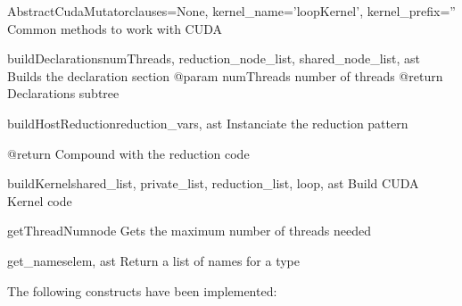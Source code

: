 \documentclass[a4paper,10pt,english]{manual}
\begin{document}
\hypertarget{Backends.CudaBackend.Mutators.Common.AbstractCudaMutator}{}\begin{classdesc}{AbstractCudaMutator}{clauses=None, kernel\_name='loopKernel', kernel\_prefix=''}
Common methods to work with CUDA

\hypertarget{Backends.CudaBackend.Mutators.Common.AbstractCudaMutator.buildDeclarations}{}\begin{methoddesc}{buildDeclarations}{numThreads, reduction\_node\_list, shared\_node\_list, ast}
Builds the declaration section 
@param numThreads number of threads
@return Declarations subtree
\end{methoddesc}

\hypertarget{Backends.CudaBackend.Mutators.Common.AbstractCudaMutator.buildHostReduction}{}\begin{methoddesc}{buildHostReduction}{reduction\_vars, ast}
Instanciate the reduction pattern

@return Compound with the reduction code
\end{methoddesc}

\hypertarget{Backends.CudaBackend.Mutators.Common.AbstractCudaMutator.buildKernel}{}\begin{methoddesc}{buildKernel}{shared\_list, private\_list, reduction\_list, loop, ast}
Build CUDA Kernel code
\end{methoddesc}

\hypertarget{Backends.CudaBackend.Mutators.Common.AbstractCudaMutator.getThreadNum}{}\begin{methoddesc}{getThreadNum}{node}
Gets the maximum number of threads needed
\end{methoddesc}

\hypertarget{Backends.CudaBackend.Mutators.Common.AbstractCudaMutator.get\_names}{}\begin{methoddesc}{get\_names}{elem, ast}
Return a list of names for a type
\end{methoddesc}
\end{classdesc}

The following constructs have been implemented:
\end{document}
